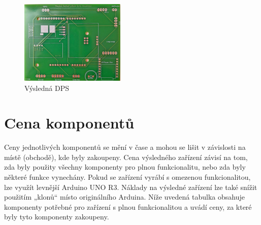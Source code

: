 \begin{figure}[H]
	\centering
	\includegraphics[width=5cm]{images/komponenty/dps_foto.jpg}
	\caption{Výsledná DPS}
\end{figure}

\section{Cena komponentů}
Ceny jednotlivých komponentů se mění v čase a mohou se lišit v závislosti na místě (obchodě), kde byly zakoupeny. Cena výsledného zařízení závisí na tom, zda byly použity všechny komponenty pro plnou funkcionalitu, nebo zda byly některé funkce vynechány.  Pokud se zařízení vyrábí s omezenou funkcionalitou, lze využít levnější Arduino UNO R3. Náklady na výsledné zařízení lze také snížit použitím „klonů“ místo originálního Arduina. Níže uvedená tabulka obsahuje komponenty potřebné pro zařízení s plnou funkcionalitou a uvádí ceny, za které byly tyto komponenty zakoupeny.

